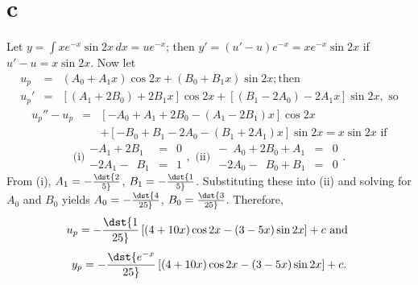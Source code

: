 \documentclass[dvips]{book}
\numberwithin{example}{section}
\numberwithin{equation}{section}
\numberwithin{theorem}{section}
\numberwithin{table}{section}
\numberwithin{figure}{section}
\begin{document}
\part{c} Let $y=\int xe^{-x}\sin2x\,dx=ue^{-x}$; then
$y'=(u'-u)e^{-x}=xe^{-x}\sin2x$ if $u'-u=x\sin2x$. Now let
\begin{eqnarray*} u_p&=&(A_0+A_1x)\cos2x +(B_0+B_1x)\sin2x;\mbox{
then}\\ u_p'&=&\left[(A_1+2B_0)+2B_1x\right]\cos2x
+\left[(B_1-2A_0)-2A_1x\right]\sin2x,\mbox{ so} \end{eqnarray*}
\begin{eqnarray*}
u_p''-u_p&=&\left[-A_0+A_1+2B_0-(A_1-2B_1)x\right]\cos2x\\ &&
+\left[-B_0+B_1-2A_0-(B_1+2A_1)x\right]\sin2x=x\sin2x\mbox{ if}
\end{eqnarray*} $$ \mbox{(i)} \begin{array}{rcl} -A_1+2B_1&=&0\\
-2A_1-\phantom{2}B_1&=&1 \end{array}, \mbox{ (ii) } \begin{array}{rcl}
-\phantom{2}A_0+2B_0+A_1&=&0\\ -2A_0-\phantom{2}B_0+B_1&=&0
\end{array}. $$ From (i), $A_1=-\dst{2\over5}$, $B_1=-\dst{1\over5}$.
Substituting these into (ii) and solving for $A_0$ and $B_0$ yields
$A_0=-\dst{4\over25}$, $B_0=\dst{3\over25}$. Therefore,$$
u_p=-\dst{1\over25}\left[(4+10x)\cos 2x-(3-5x)\sin2x\right]+c \mbox{
and } $$ $$ y_p=-\dst{e^{-x}\over25}\left[(4+10x)\cos
2x-(3-5x)\sin2x\right]+c. $$
\end{document}
